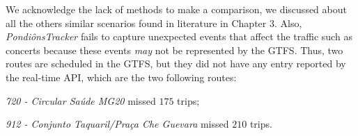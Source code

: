 We acknowledge the lack of methods to make a comparison, we discussed about all the others similar scenarios found in literature in Chapter 3.
Also, \textit{PondiônsTracker} fails to capture unexpected events that affect the traffic such as concerts because these events {\em may} not be represented by the GTFS. 
Thus, two routes are scheduled in the GTFS, but they did not have any entry reported by the real-time API, which are 
the two following routes:
\begin{enumerate*}
    \item \textit{720 - Circular Saúde MG20} missed $175$ trips;
    \item \textit{912 - Conjunto Taquaril/Praça Che Guevara} missed $210$ trips.
\end{enumerate*}

